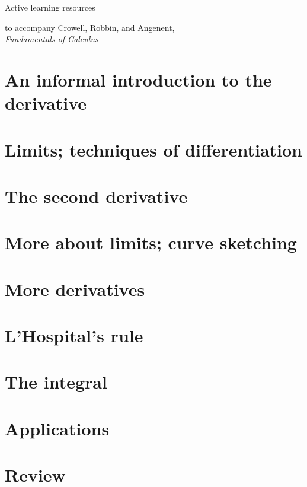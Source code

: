 \documentclass[t]{beamer}
\begin{document}
\newcommand{\der}{\operatorname{d\!}{}}

\newcommand{\mygamma}{\textup{\textgamma}}



\begin{frame}{Active learning resources}

to accompany Crowell, Robbin, and Angenent,\\
 \emph{Fundamentals of Calculus}

\end{frame}

\tableofcontents

\section{An informal introduction to the derivative}






\section{Limits; techniques of differentiation}




\section{The second derivative}


\section{More about limits; curve sketching}



\section{More derivatives}


\section{L'Hospital's rule}


\section{The integral}


\section{Applications}


\section{Review}

\end{document}

